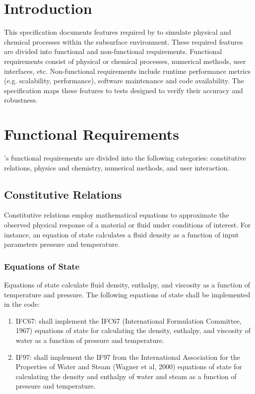 \section{Introduction}
This specification documents features required by \pft to simulate physical and chemical processes within the subsurface environment. These required features are divided into functional and non-functional requirements. Functional requirements consist of physical or chemical processes, numerical methods, user interfaces, etc.  Non-functional requirements include runtime performance metrics (e.g. scalability,  performance), software maintenance and code availability. The specification maps these features to tests designed to verify their accuracy and robustness.

\section{Functional Requirements}
\pft’s functional requirements are divided into the following categories: constitutive relations, physics and chemistry, numerical methods, and user interaction.
\subsection{Constitutive Relations}

Constitutive relations employ mathematical equations to approximate the observed physical response of a material or fluid under conditions of interest. For instance, an equation of state calculates a fluid density as a function of input parameters pressure and temperature.

\subsubsection{Equations of State}
Equations of state calculate fluid density, enthalpy, and viscosity as a function of temperature and pressure. The following equations of state shall be implemented in the code:
\begin{enumerate}
	\item IFC67: \label{ifc67} \pft shall implement the IFC67 (International Formulation Committee, 1967) equations of state for calculating the density, enthalpy, and viscosity of water as a function of pressure and temperature.
	\item IF97: \label{if97} \pft shall implement the IF97 from the International Association for the Properties of Water and Steam (Wagner et al, 2000) equations of state for calculating the density and enthalpy of water and steam as a function of pressure and temperature.
\end{enumerate}

